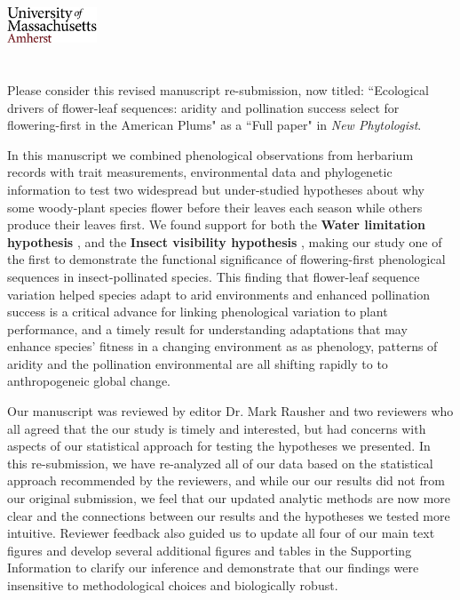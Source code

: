 \documentclass{article}[12pt]
\begin{document}

\noindent\includegraphics[width=0.2\textwidth]{umasslogo}\\\\

\\

\noindent Please consider this revised manuscript re-submission, now titled: ``Ecological drivers of flower-leaf sequences: aridity and pollination success select for flowering-first in the American Plums" as a ``Full paper" in \textit{New Phytologist}.

In this manuscript we combined phenological observations from herbarium records with trait measurements, environmental data and phylogenetic information to test two widespread but under-studied hypotheses about why some woody-plant species flower before their leaves each season while others produce their leaves first. We found support for both the \textbf{Water limitation hypothesis} \citep{Gougherty2018,Buonaiuto2020}, and the \textbf{Insect visibility hypothesis} \citep{Janzen1967}, making our study one of the first to demonstrate the functional significance of flowering-first phenological sequences in insect-pollinated species. This finding that flower-leaf sequence variation helped species adapt to arid environments and enhanced pollination success is a critical advance for linking phenological variation to plant performance, and a timely result for understanding adaptations that may enhance species' fitness in a changing environment as as phenology, patterns of aridity and the pollination environmental are all shifting rapidly to to anthropogeneic global change.

Our manuscript was reviewed by editor Dr. Mark Rausher and two reviewers who all agreed that the our study is timely and interested, but had concerns with aspects of our statistical approach for testing the hypotheses we presented. In this re-submission, we have re-analyzed all of our data based on the statistical approach recommended by the reviewers, and while our our results did not from our original submission, we feel that our updated analytic methods are now more clear and the connections between our results and the hypotheses we tested more intuitive. Reviewer feedback also guided us to update all four of our main text figures and develop several additional figures and tables in the Supporting Information to clarify our inference and demonstrate that our findings were insensitive to methodological choices and biologically robust.
\end{document}
